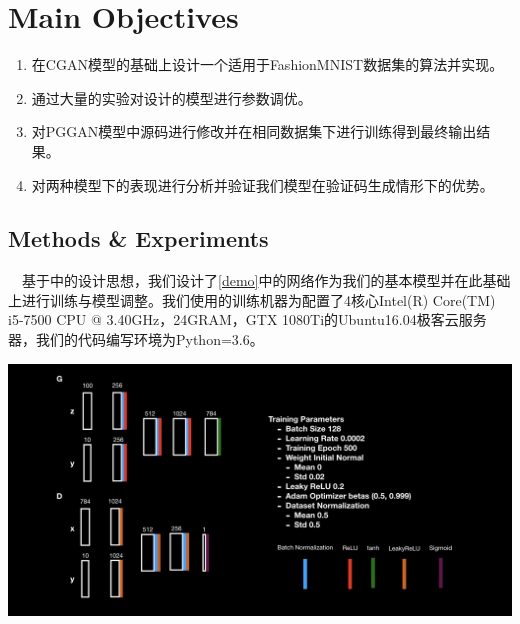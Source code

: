 \documentclass[portrait]{a0poster}
\begin{document}
\begin{multicols}{2}
\begin{CJK}{UTF8}{gbsn}
\end{CJK}

\color{DarkSlateGray} %

\section*{Main Objectives}
\begin{CJK}{UTF8}{gbsn}
\begin{enumerate}
\item 在CGAN模型的基础上设计一个适用于FashionMNIST数据集的算法并实现。
\item 通过大量的实验对设计的模型进行参数调优。
\item 对PGGAN模型中源码进行修改并在相同数据集下进行训练得到最终输出结果。
\item 对两种模型下的表现进行分析并验证我们模型在验证码生成情形下的优势。
\end{enumerate}
\end{CJK}
\begin{CJK}{UTF8}{gbsn}
\section*{Methods \& Experiments}

\ \ 基于\cite{DBLP:journals/corr/MirzaO14}中的设计思想，我们设计了\ref{demo}中的网络作为我们的基本模型并在此基础上进行训练与模型调整。我们使用的训练机器为配置了4核心Intel(R) Core(TM) i5-7500 CPU @ 3.40GHz，24GRAM，GTX 1080Ti的Ubuntu16.04极客云服务器，我们的代码编写环境为Python=3.6。
\begin{center}\vspace{1cm}
\includegraphics[width=1.0\linewidth]{demo.jpeg}
\label{demo}
\end{center}\vspace{1cm}


\end{CJK}
\end{multicols}
\end{document}
